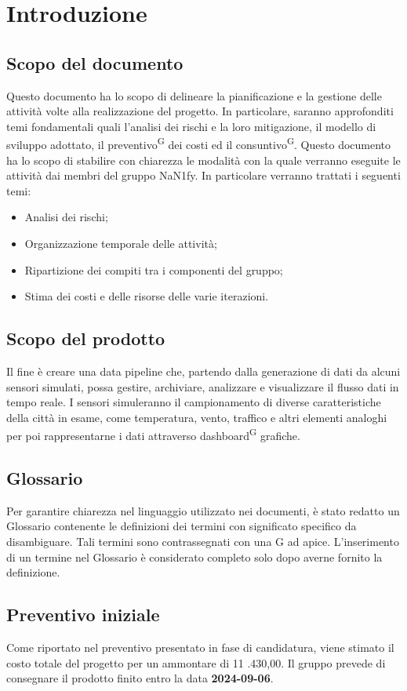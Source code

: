 \documentclass[8pt]{article}
\newcommand{\glossterm}[1]{#1\textsuperscript{G}} %
\begin{document}
\section{Introduzione} \label{sec:intro}
\subsection{Scopo del documento}
Questo documento ha lo scopo di delineare la pianificazione e la gestione delle attività volte alla realizzazione del progetto. In particolare, saranno approfonditi temi fondamentali quali l'analisi dei rischi e la loro mitigazione, il modello di sviluppo adottato, il \glossterm{preventivo} dei costi ed il \glossterm{consuntivo}. Questo documento ha lo scopo di stabilire con chiarezza le modalità con la quale verranno eseguite
le attività dai membri del gruppo NaN1fy. In particolare verranno trattati i seguenti temi:
\begin{itemize}
\setlength\itemsep{0em}
    \item Analisi dei rischi;
    \item Organizzazione temporale delle attivit\`{a};
    \item Ripartizione dei compiti tra i componenti del gruppo;
    \item Stima dei costi e delle risorse delle varie iterazioni.
\end{itemize}
\subsection{Scopo del prodotto}
Il fine è creare una data pipeline che, partendo dalla generazione di dati da alcuni sensori simulati, possa gestire, archiviare, analizzare e visualizzare il flusso dati in tempo reale. I sensori simuleranno il campionamento di diverse caratteristiche della città in esame, come temperatura, vento, traffico e altri elementi analoghi per poi rappresentarne i dati attraverso \glossterm{dashboard} grafiche.
\subsection{Glossario}
Per garantire chiarezza nel linguaggio utilizzato nei documenti, è stato redatto un Glossario contenente le definizioni dei termini con significato specifico da disambiguare. Tali termini sono contrassegnati con una G ad apice. L'inserimento di un termine nel Glossario è considerato completo solo dopo averne fornito la definizione.

\subsection{Preventivo iniziale}
Come riportato nel preventivo presentato in fase di candidatura, viene stimato il costo totale del
progetto per un ammontare di 11 .430,00\;\texteuro. Il gruppo prevede di consegnare il
prodotto finito entro la data \textbf{2024-09-06}.
\end{document}

